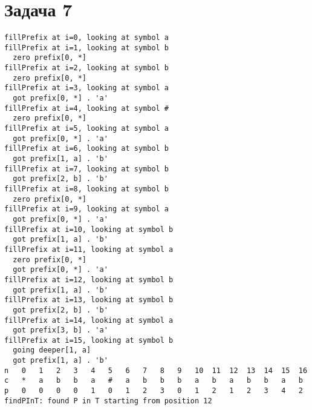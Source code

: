 \documentclass[a4paper]{article}
\begin{document}
\section*{Задача 7}
\begin{verbatim}
fillPrefix at i=0, looking at symbol a
fillPrefix at i=1, looking at symbol b
  zero prefix[0, *]
fillPrefix at i=2, looking at symbol b
  zero prefix[0, *]
fillPrefix at i=3, looking at symbol a
  got prefix[0, *] . 'a'
fillPrefix at i=4, looking at symbol #
  zero prefix[0, *]
fillPrefix at i=5, looking at symbol a
  got prefix[0, *] . 'a'
fillPrefix at i=6, looking at symbol b
  got prefix[1, a] . 'b'
fillPrefix at i=7, looking at symbol b
  got prefix[2, b] . 'b'
fillPrefix at i=8, looking at symbol b
  zero prefix[0, *]
fillPrefix at i=9, looking at symbol a
  got prefix[0, *] . 'a'
fillPrefix at i=10, looking at symbol b
  got prefix[1, a] . 'b'
fillPrefix at i=11, looking at symbol a
  zero prefix[0, *]
  got prefix[0, *] . 'a'
fillPrefix at i=12, looking at symbol b
  got prefix[1, a] . 'b'
fillPrefix at i=13, looking at symbol b
  got prefix[2, b] . 'b'
fillPrefix at i=14, looking at symbol a
  got prefix[3, b] . 'a'
fillPrefix at i=15, looking at symbol b
  going deeper[1, a]
  got prefix[1, a] . 'b'
n	0	1	2	3	4	5	6	7	8	9	10	11	12	13	14	15	16	
c	*	a	b	b	a	#	a	b	b	b	a	b	a	b	b	a	b	
p	0	0	0	0	1	0	1	2	3	0	1	2	1	2	3	4	2	
findPInT: found P in T starting from position 12
\end{verbatim}
\end{document}
